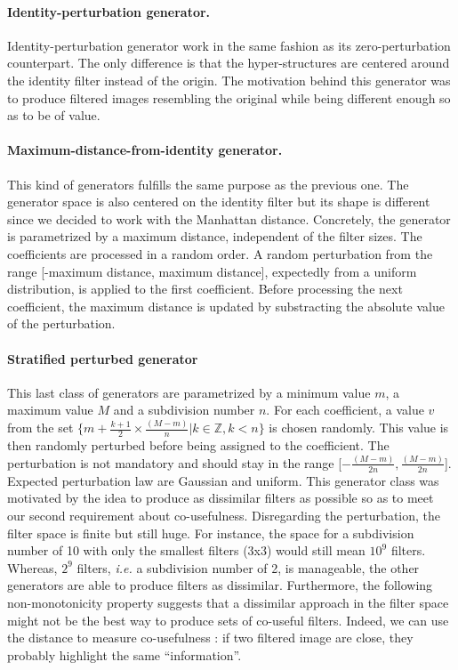 \documentclass[a4paper]{report}
\begin{document}
			\paragraph{Identity-perturbation generator.}
			Identity-perturbation generator work in the same fashion as its zero-perturbation counterpart. The only difference is that the hyper-structures are centered around the identity filter instead of the origin. 
			The motivation behind this generator was to produce filtered images resembling the original while being different enough so as to be of value.
			\paragraph{Maximum-distance-from-identity generator.} 
			This kind of generators fulfills the same purpose as the previous one. The generator space is also centered on the identity filter but its shape is different since we decided to work with the Manhattan distance. Concretely, the generator is parametrized by a maximum distance, independent of the filter sizes. The coefficients are processed in a random order. A random perturbation from the range [-maximum distance, maximum distance], expectedly from a uniform distribution, is applied to the first coefficient. Before processing the next coefficient, the maximum distance is updated by substracting the absolute value of the perturbation.
			\paragraph{Stratified perturbed generator}
			This last class of generators are parametrized by a minimum value $m$, a maximum value $M$ and a subdivision number $n$. For each coefficient, a value $v$ from the set $\{m + \frac{k+1}{2} \times \frac{(M-m)}{n} | k \in \mathbb{Z}, k < n\}$ is chosen randomly.  This value is then randomly perturbed before being assigned to the coefficient. The perturbation is not mandatory and should stay in the range [$-\frac{(M-m)}{2n}, \frac{(M-m)}{2n}$]. Expected perturbation law are Gaussian and uniform.
			This generator class was motivated by the idea to produce as dissimilar filters as possible so as to meet our second requirement about co-usefulness. Disregarding the perturbation, the filter space is finite but still huge. For instance, the space for a subdivision number of 10 with only the smallest filters (3x3) would still mean $10^9$ filters.  Whereas, $2^9$ filters, \textit{i.e.} a subdivision number of 2, is manageable, the other generators are able to produce filters as dissimilar. Furthermore, the following non-monotonicity property suggests that a dissimilar approach in the filter space might not be the best way to produce sets of co-useful filters. Indeed, we can use the distance to measure co-usefulness : if two filtered image are close, they probably highlight the same ``information''.
			
\end{document}

